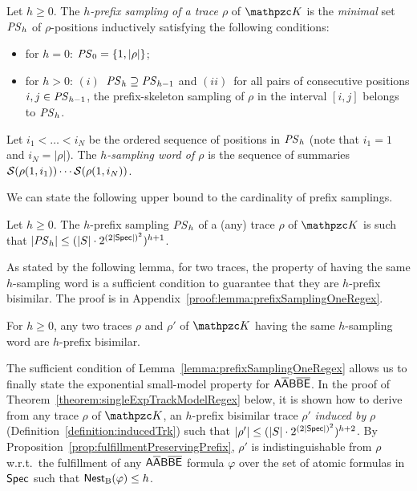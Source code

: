 \begin{definition} Let $h\geq 0$.
The \emph{$h$-prefix sampling of a trace $\rho$} of $\Ku$ is the \emph{minimal} set ${\mathit{PS}}_h$ of $\rho$-positions inductively satisfying the following conditions:
\begin{itemize}
  \item for $h=0$: ${\mathit{PS}}_0=\{1,|\rho|\}$;
  \item for $h> 0$: 
  $(i)$~${\mathit{PS}}_h\supseteq{\mathit{PS}}_{h-1}$ and
  $(ii)$~for all pairs of consecutive positions $i,j\in{\mathit{PS}}_{h-1}$,
  the prefix-skeleton sampling of $\rho$ in the interval $[i,j]$ belongs to ${\mathit{PS}}_h$.
\end{itemize}

Let $i_1<\ldots<i_N$ be the ordered sequence of positions in ${\mathit{PS}}_h$ (note that $i_1=1$ and $i_N=|\rho|$). The \emph{$h$-sampling word of $\rho$} is the sequence of summaries %
$\mathcal{S}(\rho(1,i_1))\cdots \mathcal{S}(\rho(1,i_N))$.
\end{definition}

 We can state the following upper bound to the cardinality of prefix samplings.

\begin{property}\label{property:prefSamBoundRegex}
Let $h\geq 0$. The $h$-prefix sampling ${\mathit{PS}}_h$ of a (any) trace $\rho$ of $\Ku$ is such that $|{\mathit{PS}}_h|\leq (|S|\cdot 2^{(2|\textsf{Spec}|)^2})^{h+1}$.
\end{property}


As stated by the following lemma, for two traces, the property of having the same $h$-sampling word is a sufficient condition to guarantee that they are $h$-prefix bisimilar.
The proof is in Appendix~\ref{proof:lemma:prefixSamplingOneRegex}.
%
\begin{lemma}\label{lemma:prefixSamplingOneRegex} For $h\geq 0$, any two traces
$\rho$ and  $\rho'$ of $\Ku$ having the same
$h$-sampling word are $h$-prefix bisimilar.
\end{lemma}

The sufficient condition of Lemma~\ref{lemma:prefixSamplingOneRegex} allows us to finally state the exponential small-model property for $\mathsf{A\overline{A}B\overline{B}\overline{E}}$. In the proof of Theorem~\ref{theorem:singleExpTrackModelRegex} below, it is shown  how to derive from any trace $\rho$ of $\Ku$, an $h$-prefix  bisimilar trace $\rho'$ \emph{induced by} $\rho$ 
(Definition~\ref{definition:inducedTrk}) 
such that $|\rho'|\leq (|S|\cdot 2^{(2|\textsf{Spec}|)^2})^{h+2}$. By Proposition~\ref{prop:fulfillmentPreservingPrefix}, $\rho'$ is indistinguishable from $\rho$ w.r.t.\ the fulfillment of any $\mathsf{A\overline{A}B\overline{B}\overline{E}}$ formula $\varphi$ over the set of atomic formulas in $\textsf{Spec}$ such that $\operatorname{\mathsf{Nest}_B}(\varphi)\leq h$. 

